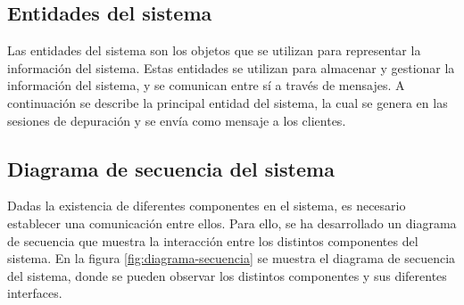 \subsection{Entidades del sistema} \label{sec:entidades-sistema}

Las entidades del sistema son los objetos que se utilizan para representar la información del sistema. Estas entidades se utilizan para almacenar y gestionar la información del sistema, y se comunican entre sí a través de mensajes. A continuación se describe la principal entidad del sistema, la cual se genera en las sesiones de depuración y se envía como mensaje a los clientes.


\subsection{Diagrama de secuencia del sistema} \label{sec:diagrama-secuencia}
Dadas la existencia de diferentes componentes en el sistema, es necesario establecer una comunicación entre ellos. Para ello, se ha desarrollado un diagrama de secuencia que muestra la interacción entre los distintos componentes del sistema. En la figura \ref{fig:diagrama-secuencia} se muestra el diagrama de secuencia del sistema, donde se pueden observar los distintos componentes y sus diferentes interfaces.


